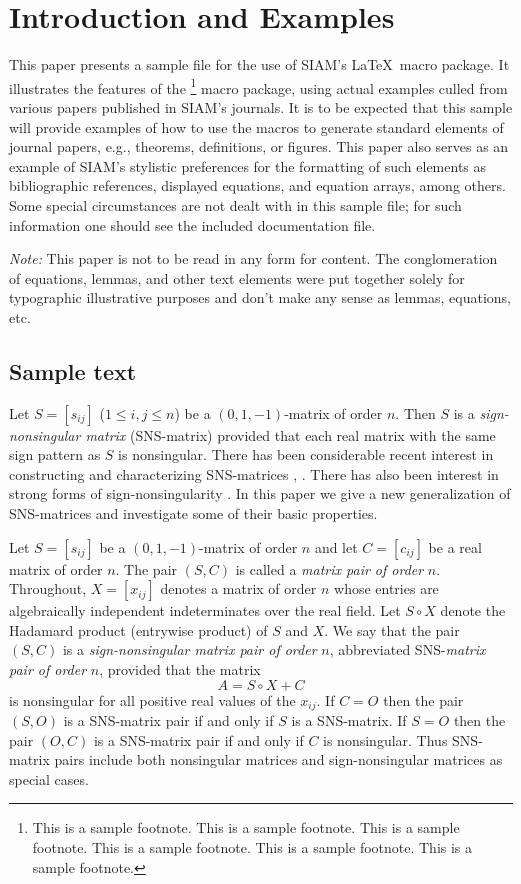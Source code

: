 \documentclass{SIAMGHbook2016}
\begin{document}
\section{Introduction and Examples}
This paper presents a sample file for the use of SIAM's
\LaTeX\ macro package. It illustrates the features of the%
\footnote{This is a sample footnote. This is a sample footnote.
This is a sample footnote. This is a sample footnote.
This is a sample footnote. This is a sample footnote.}
macro package, using actual examples culled from various
papers published in SIAM's journals. It is to be expected
that this sample will provide examples of how to use the
macros to generate standard elements of journal papers,
e.g., theorems, definitions, or figures. This paper also
serves as an example of SIAM's stylistic preferences for
the formatting of such elements as bibliographic references,
displayed equations, and equation arrays, among others.
Some special circumstances are not dealt with in this
sample file; for such information one should see the
included documentation file.

{\em Note:} This paper is not to be read in any form for content.
The conglomeration of equations, lemmas, and other text elements were
put together solely for typographic illustrative purposes and don't
make any sense as lemmas, equations, etc.

\subsection{Sample text}
Let $S=[s_{ij}]$ ($1\leq i,j\leq n$) be a $(0,1,-1)$-matrix
of order $n$. Then $S$ is a {\em sign-nonsingular matrix}
(SNS-matrix) provided that each real matrix with the same
sign pattern as $S$ is nonsingular. There has been
considerable recent interest in constructing and
characterizing SNS-matrices \cite{bs}, \cite{klm}. There
has also been interest in strong forms of
sign-nonsingularity \cite{djd}. In this paper we give a new
generalization of SNS-matrices and investigate some of
their basic properties.


Let $S=[s_{ij}]$ be a $(0,1,-1)$-matrix of order $n$ and
let $C=[c_{ij}]$ be a real matrix of order $n$. The pair
$(S,C)$ is called a {\em matrix pair of order} $n$.
Throughout, $X=[x_{ij}]$ denotes a matrix of order $n$
whose entries are algebraically independent indeterminates
over the real field. Let $S\circ X$ denote the Hadamard
product (entrywise product) of $S$ and $X$. We say that the
pair $(S,C)$ is a {\em sign-nonsingular matrix pair of
order} $n$, abbreviated SNS-{\em matrix pair of order} $n$,
provided that the matrix \[A=S\circ X+C\] is nonsingular
for all positive real values of the $x_{ij}$.  If $C=O$
then the pair $(S,O)$ is a SNS-matrix pair if and only if
$S$ is a SNS-matrix.  If $S=O$ then the pair $(O,C)$ is a
SNS-matrix pair if and only if $C$ is nonsingular. Thus
SNS-matrix pairs include both nonsingular matrices and
sign-nonsingular matrices as special cases.
\end{document}
